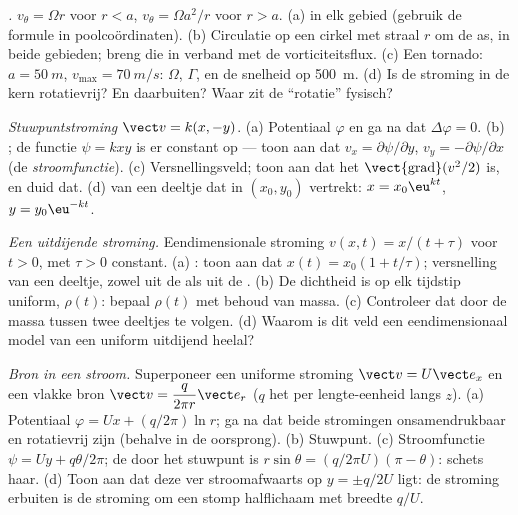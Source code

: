 \begin{exercise}[$\star\star$]\label{exo:b2:fluid-kinematics:8}
\emph{.} $v_\theta = \Omega r$ voor $r < a$,
$v_\theta = \Omega a^2/r$ voor $r > a$. (a)  in elk gebied
(gebruik de formule in poolcoördinaten). (b) Circulatie op een cirkel met
straal $r$ om de as, in beide gebieden; breng die in verband met de
vorticiteitsflux. (c) Een tornado: $a = \qty{50}{m}$,
$v_{\max} = \qty{70}{m/s}$: $\Omega$, $\Gamma$, en de snelheid op
\qty{500}{m}. (d) Is de stroming in de kern rotatievrij? En daarbuiten? Waar
zit de ``rotatie'' fysisch?
\end{exercise}

\begin{exercise}[$\star\star$]\label{exo:b2:fluid-kinematics:9}
\emph{Stuwpuntstroming} $\vect v = k(x, -y)$. (a) Potentiaal $\varphi$ en ga
na dat $\Delta\varphi = 0$. (b) ; de functie $\psi = kxy$ is er
constant op --- toon aan dat $v_x = \partial\psi/\partial y$,
$v_y = -\partial\psi/
\partial x$ (de \emph{stroomfunctie}). (c)
Versnellingsveld; toon aan dat het $\operatorname{\vect{grad}}(v^2/2)$ is,
en duid dat. (d)  van een deeltje dat in $(x_0, y_0)$ vertrekt:
$x = x_0\eu^{kt}$, $y = y_0\eu^{-kt}$.
\end{exercise}

\begin{exercise}[$\star\star\star$]\label{exo:b2:fluid-kinematics:10}
\emph{Een uitdijende stroming.} Eendimensionale stroming
$v(x, t) = x/(t + \tau)$ voor $t > 0$, met $\tau > 0$ constant. (a)
: toon aan dat $x(t) = x_0(1 +
t/\tau)$; versnelling van een
deeltje, zowel uit de  als uit de . (b) De
dichtheid is op elk tijdstip uniform, $\rho(t)$: bepaal $\rho(t)$ met behoud
van massa. (c) Controleer dat door de massa tussen twee deeltjes te volgen.
(d) Waarom is dit veld een eendimensionaal model van een uniform uitdijend
heelal?
\end{exercise}

\begin{exercise}[$\star\star\star$]\label{exo:b2:fluid-kinematics:11}
\emph{Bron in een stroom.} Superponeer een uniforme stroming
$\vect v = U\vect e_x$ en een vlakke bron
$\vect v = \dfrac{q}{2\pi r}\vect e_r$ ($q$ het  per
lengte-eenheid langs $z$). (a) Potentiaal $\varphi = Ux +
(q/2\pi)\ln r$; ga
na dat beide stromingen onsamendrukbaar en rotatievrij zijn (behalve in de
oorsprong). (b) Stuwpunt. (c) Stroomfunctie $\psi
= Uy + q\theta/2\pi$; de
 door het stuwpunt is $r\sin\theta = (q/2\pi U)(\pi - \theta)$:
schets haar. (d) Toon aan dat deze  ver stroomafwaarts op
$y = \pm q/2U$ ligt: de stroming erbuiten is de stroming om een stomp
halflichaam met breedte $q/U$.
\end{exercise}


